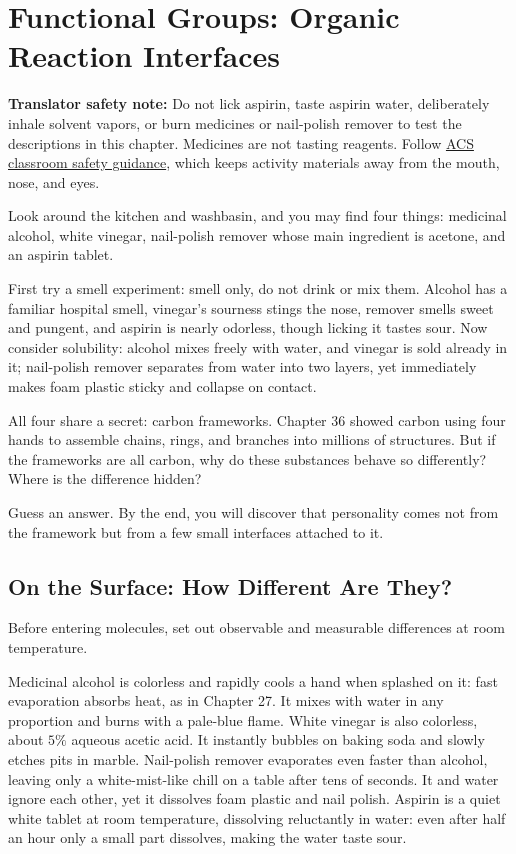 \chapter{Functional Groups: Organic Reaction Interfaces}

\begin{kaichang}
\textbf{Translator safety note:} Do not lick aspirin, taste aspirin water, deliberately inhale solvent vapors, or burn medicines or nail-polish remover to test the descriptions in this chapter. Medicines are not tasting reagents. Follow \href{https://www.acs.org/content/dam/acsorg/about/governance/committees/chemicalsafety/safetypractices/safety-in-the-elementary-school-science-classroom.pdf}{ACS classroom safety guidance}, which keeps activity materials away from the mouth, nose, and eyes.

Look around the kitchen and washbasin, and you may find four things: medicinal alcohol, white vinegar, nail-polish remover whose main ingredient is acetone, and an aspirin tablet.

First try a smell experiment: smell only, do not drink or mix them. Alcohol has a familiar hospital smell, vinegar's sourness stings the nose, remover smells sweet and pungent, and aspirin is nearly odorless, though licking it tastes sour. Now consider solubility: alcohol mixes freely with water, and vinegar is sold already in it; nail-polish remover separates from water into two layers, yet immediately makes foam plastic sticky and collapse on contact.

All four share a secret: carbon frameworks. Chapter 36 showed carbon using four hands to assemble chains, rings, and branches into millions of structures. But if the frameworks are all carbon, why do these substances behave so differently? Where is the difference hidden?

Guess an answer. By the end, you will discover that personality comes not from the framework but from a few small interfaces attached to it.
\end{kaichang}

\section{On the Surface: How Different Are They?}

Before entering molecules, set out observable and measurable differences at room temperature.

Medicinal alcohol is colorless and rapidly cools a hand when splashed on it: fast evaporation absorbs heat, as in Chapter 27. It mixes with water in any proportion and burns with a pale-blue flame. White vinegar is also colorless, about $5\%$ aqueous acetic acid. It instantly bubbles on baking soda and slowly etches pits in marble. Nail-polish remover evaporates even faster than alcohol, leaving only a white-mist-like chill on a table after tens of seconds. It and water ignore each other, yet it dissolves foam plastic and nail polish. Aspirin is a quiet white tablet at room temperature, dissolving reluctantly in water: even after half an hour only a small part dissolves, making the water taste sour.

